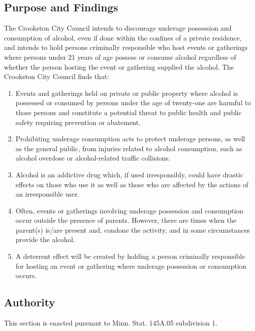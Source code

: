 \subsection{Purpose and Findings}
The Crookston City Council intends to discourage underage possession and consumption of alcohol, even if done within the confines of a private residence, and intends to hold persons criminally responsible who host events or gatherings where persons under 21 years of age possess or consume alcohol regardless of whether the person hosting the event or gathering supplied the alcohol. The Crookston City Council finds that:
\begin{enumerate}[{\indent}1)]
    \item Events and gatherings held on private or public property where alcohol is possessed or consumed by persons under the age of twenty-one are harmful to those persons and constitute a potential threat to public health and public safety requiring prevention or abatement.
    \item Prohibiting underage consumption acts to protect underage persons, as well as the general public, from injuries related to alcohol consumption, such as alcohol overdose or alcohol-related traffic collisions.
    \item Alcohol is an addictive drug which, if used irresponsibly, could have drastic effects on those who use it as well as those who are affected by the actions of an irresponsible user.
    \item Often, events or gatherings involving underage possession and consumption occur outside the presence of parents. However, there are times when the parent(s) is/are present and, condone the activity, and in some circumstances provide the alcohol.
    \item A deterrent effect will be created by holding a person criminally responsible for hosting an event or gathering where underage possession or consumption occurs.
\end{enumerate}
\subsection{Authority}
This section is enacted pursuant to Minn. Stat. \textsection 145A.05 subdivision 1.
